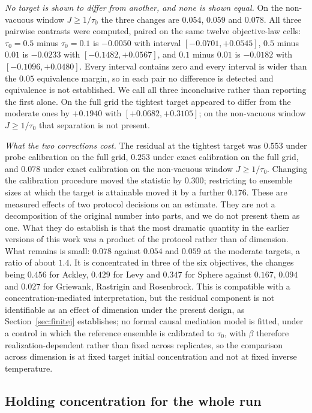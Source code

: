 \documentclass[pdflatex,sn-mathphys-num]{sn-jnl}
\theoremstyle{thmstyleone}
\theoremstyle{thmstyletwo}
\theoremstyle{thmstylethree}
\begin{document}
\emph{No target is shown to differ from another, and none is shown equal.} On the non-vacuous window $J\ge1/\tau_0$ the three changes are $0.054$, $0.059$ and $0.078$. All three pairwise contrasts were computed, paired on the same twelve objective-law cells: $\tau_0=0.5$ minus $\tau_0=0.1$ is $-0.0050$ with interval $[-0.0701,+0.0545]$, $0.5$ minus $0.01$ is $-0.0233$ with $[-0.1482,+0.0567]$, and $0.1$ minus $0.01$ is $-0.0182$ with $[-0.1096,+0.0480]$. Every interval contains zero and every interval is wider than the $0.05$ equivalence margin, so in each pair no difference is detected and equivalence is not established. We call all three inconclusive rather than reporting the first alone. On the full grid the tightest target appeared to differ from the moderate ones by $+0.1940$ with $[+0.0682,+0.3105]$; on the non-vacuous window $J\ge1/\tau_0$ that separation is not present.

\emph{What the two corrections cost.} The residual at the tightest target was $0.553$ under probe calibration on the full grid, $0.253$ under exact calibration on the full grid, and $0.078$ under exact calibration on the non-vacuous window $J\ge1/\tau_0$. Changing the calibration procedure moved the statistic by $0.300$; restricting to ensemble sizes at which the target is attainable moved it by a further $0.176$. These are measured effects of two protocol decisions on an estimate. They are not a decomposition of the original number into parts, and we do not present them as one. What they do establish is that the most dramatic quantity in the earlier versions of this work was a product of the protocol rather than of dimension. What remains is small: $0.078$ against $0.054$ and $0.059$ at the moderate targets, a ratio of about $1.4$. It is concentrated in three of the six objectives, the changes being $0.456$ for Ackley, $0.429$ for Levy and $0.347$ for Sphere against $0.167$, $0.094$ and $0.027$ for Griewank, Rastrigin and Rosenbrock. This is compatible with a concentration-mediated interpretation, but the residual component is not identifiable as an effect of dimension under the present design, as Section~\ref{sec:finitej} establishes; no formal causal mediation model is fitted, under a control in which the reference ensemble is calibrated to $\tau_0$, with $\beta$ therefore realization-dependent rather than fixed across replicates, so the comparison across dimension is at fixed target initial concentration and not at fixed inverse temperature.

\subsection{Holding concentration for the whole run}\label{sec:wholerun}
\end{document}
